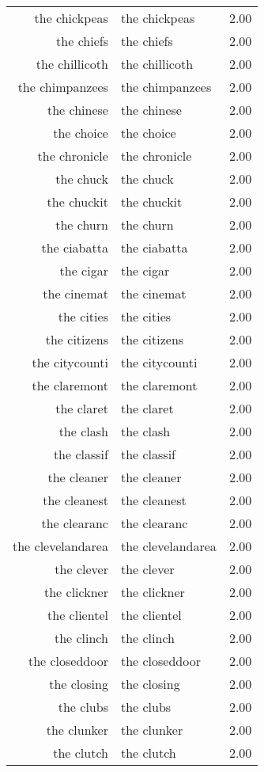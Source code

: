 \begin{table}[ht]
\begin{tabular}{rlr}
  the chickpeas & the chickpeas & 2.00 \\ 
  the chiefs & the chiefs & 2.00 \\ 
  the chillicoth & the chillicoth & 2.00 \\ 
  the chimpanzees & the chimpanzees & 2.00 \\ 
  the chinese & the chinese & 2.00 \\ 
  the choice & the choice & 2.00 \\ 
  the chronicle & the chronicle & 2.00 \\ 
  the chuck & the chuck & 2.00 \\ 
  the chuckit & the chuckit & 2.00 \\ 
  the churn & the churn & 2.00 \\ 
  the ciabatta & the ciabatta & 2.00 \\ 
  the cigar & the cigar & 2.00 \\ 
  the cinemat & the cinemat & 2.00 \\ 
  the cities & the cities & 2.00 \\ 
  the citizens & the citizens & 2.00 \\ 
  the citycounti & the citycounti & 2.00 \\ 
  the claremont & the claremont & 2.00 \\ 
  the claret & the claret & 2.00 \\ 
  the clash & the clash & 2.00 \\ 
  the classif & the classif & 2.00 \\ 
  the cleaner & the cleaner & 2.00 \\ 
  the cleanest & the cleanest & 2.00 \\ 
  the clearanc & the clearanc & 2.00 \\ 
  the clevelandarea & the clevelandarea & 2.00 \\ 
  the clever & the clever & 2.00 \\ 
  the clickner & the clickner & 2.00 \\ 
  the clientel & the clientel & 2.00 \\ 
  the clinch & the clinch & 2.00 \\ 
  the closeddoor & the closeddoor & 2.00 \\ 
  the closing & the closing & 2.00 \\ 
  the clubs & the clubs & 2.00 \\ 
  the clunker & the clunker & 2.00 \\ 
  the clutch & the clutch & 2.00 \\ 

\end{tabular}
\end{table}
